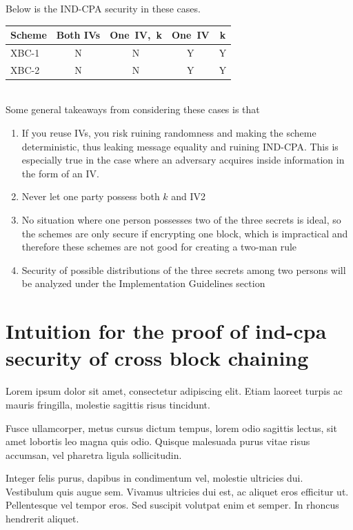 \documentclass[conference]{IEEEtran}
\begin{document}
Below is the IND-CPA security in these cases. \\

\begin{tabular}{| l | c c c c | }
\hline
  Scheme & Both IVs & One\ IV,\ k & One\ IV & k \\ \hline
  XBC-1 & N & N & Y & Y \\
  XBC-2 & N & N & Y & Y \\
\hline
\end{tabular} \\

Some general takeaways from considering these cases is that

\begin{enumerate}
  \item If you reuse IVs, you risk ruining randomness and making the scheme deterministic, thus leaking message equality and ruining IND-CPA. This is especially true in the case where an adversary acquires inside information in the form of an IV.
  \item Never let one party possess both $k$ and IV2
  \item No situation where one person possesses two of the three secrets is ideal, so the schemes are only secure if encrypting one block, which is impractical and therefore these schemes are not good for creating a two-man rule
  \item Security of possible distributions of the three secrets among two persons will be analyzed under the Implementation Guidelines section
\end{enumerate}

\section{Intuition for the proof of ind-cpa security of cross block chaining}

Lorem ipsum dolor sit amet, consectetur adipiscing elit. Etiam laoreet turpis ac mauris fringilla, molestie sagittis risus tincidunt.

Fusce ullamcorper, metus cursus dictum tempus, lorem odio sagittis lectus, sit amet lobortis leo magna quis odio. Quisque malesuada purus vitae risus accumsan, vel pharetra ligula sollicitudin.

Integer felis purus, dapibus in condimentum vel, molestie ultricies dui. Vestibulum quis augue sem. Vivamus ultricies dui est, ac aliquet eros efficitur ut. Pellentesque vel tempor eros. Sed suscipit volutpat enim et semper. In rhoncus hendrerit aliquet.
\end{document}
